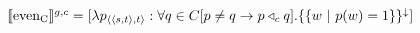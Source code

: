 $\intension[g,c]{even\textsubscript{C}}=[\lambda{p_{\langle\langle s,t\rangle,t\rangle}}:\forall{q\in C}[p\neq q\rightarrow p\lprob_c q].\{\{w~|~p(w)=1\}\}^\downarrow]$